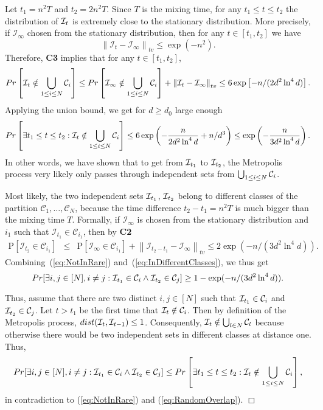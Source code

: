 \documentclass[a4paper,10pt]{article}
\newcommand{\qed}{\hfill$\Box$\smallskip}
\newcommand\cC{\mathcal{C}}
\newcommand\cI{\mathcal{I}}
\def\cC{{\mathcal C}}
\newcommand\pr{\mathrm{P}}
\newcommand\bc[1]{\left({#1}\right)}
\newcommand\brk[1]{\left\lbrack{#1}\right\rbrack}
\newcommand\norm[1]{\left\|{#1}\right\|}
\begin{document}
Let $t_1=n^{2}T$ and  $t_2=2n^{2}T$.
Since $T$ is the mixing time, for any $t_1\leq t\leq t_2$ the
 distribution of ${\cal I}_t$ is extremely close to the stationary distribution.
More precisely, if $\cI_\infty$ chosen from the stationary distribution, then for any $t\in [t_1, t_2]$ we have
	$$\norm{\cI_t-\cI_\infty}_{tv}\leq\exp\bc{-n^{2}}.$$
Therefore, {\bf C3} implies that for any $t\in [t_1, t_2]$,
\begin{displaymath}
Pr\left[{\cal I}_t\notin \bigcup_{1\leq i\leq N}{\cal C}_i \right]
\leq Pr\left[{\cal I}_\infty\notin \bigcup_{1\leq i\leq N}{\cal C}_i \right]+\norm{\cI_t-\cI_\infty}_{tv}\leq 6\exp \left[-n/(2d^2\ln^4d) \right].
\end{displaymath}
Applying the union bound, we get for $d\geq d_0$ large enough
\begin{equation}\label{eq:NotInRare}
Pr\left[\exists t_1\leq t \leq t_2: {\cal I}_t \notin \bigcup_{1\leq i\leq N}{\cal C}_i 
 \right]\leq 6\exp\left( -\frac{n}{2d^2\ln^4d}+n/d^3\right)\leq 
 \exp\left( -\frac{n}{3d^2\ln^4d}\right).
\end{equation}
In other words, we have shown that to get from ${\cal I}_{t_1}$
to ${\cal I}_{t_2}$, the Metropolis process very likely only
passes through independent  sets from $\bigcup_{1\leq i\leq N}{\cal C}_i$.

Most likely, the two independent sets ${\cal I}_{t_1}$, ${\cal I}_{t_2}$
belong to different classes of the partition $\cC_1,\ldots,\cC_N$,
because the time difference $t_2-t_1=n^2T$ is much bigger than the
mixing time $T$. Formally, if $\cI_\infty$ is chosen from the
stationary distribution and $i_{1}$ such that $\cI_{t_1}\in\cC_{i_{1}}$,
then by {\bf C2}
\begin{eqnarray}\label{eq:InDifferentClasses}
\pr\brk{\cI_{t_2}\in\cC_{i_{1}}}
   &\leq& \pr\brk{\cI_{\infty}\in\cC_{i_{1}}}+\norm{\cI_{t_2-t_1}-\cI_\infty}_{tv}
	\leq 2\exp(-n/(3d^2\ln^4 d)).
\end{eqnarray}
Combining~(\ref{eq:NotInRare}) and~(\ref{eq:InDifferentClasses}),
we thus get
\begin{equation}\label{eq:RandomOverlap}
	Pr[\exists i, j \in [N], i\neq j:{\cal I}_{t_1}\in {\cal C}_i \wedge {\cal I}_{t_2}\in {\cal C}_j]\geq 
			1-\exp(-n/(3d^2\ln^4 d)).
\end{equation}


\noindent
Thus, assume that there are two distinct $i,j\in [N]$ such that
${\cal I}_{t_1}\in {\cal C}_i$ and ${\cal I}_{t_2}\in {\cal C}_j$.
Let $t>t_1$ be the first time that ${\cal I}_t\notin {\cal C}_i$.
Then by definition of the Metropolis process, $dist({\cal I}_{t},
{\cal I}_{t-1})\leq 1$.  Consequently, ${\cal I}_t \notin \bigcup_{l\in N}{\cal C}_l$
because otherwise there would be two independent sets in different
classes at distance one. Thus,
\begin{displaymath}
Pr[\exists i, j \in [N], i\neq j:{\cal I}_{t_1}\in {\cal C}_i \wedge {\cal I}_{t_2}\in {\cal C}_j]\leq
Pr\left[\exists t_1\leq t \leq t_2: {\cal I}_t \notin \bigcup_{1\leq i\leq N}{\cal C}_i  \right],
\end{displaymath}
in contradiction to (\ref{eq:NotInRare}) and (\ref{eq:RandomOverlap}).
\qed
\end{document}
